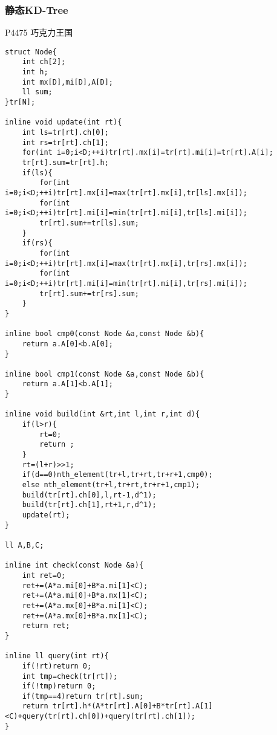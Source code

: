 \documentclass{ctexart}
\begin{document}
\subsubsection{静态KD-Tree}
P4475 巧克力王国
\begin{lstlisting}
struct Node{
	int ch[2];
	int h;
	int mx[D],mi[D],A[D];
	ll sum;
}tr[N];

inline void update(int rt){
	int ls=tr[rt].ch[0];
	int rs=tr[rt].ch[1];
	for(int i=0;i<D;++i)tr[rt].mx[i]=tr[rt].mi[i]=tr[rt].A[i];
	tr[rt].sum=tr[rt].h;
	if(ls){
		for(int i=0;i<D;++i)tr[rt].mx[i]=max(tr[rt].mx[i],tr[ls].mx[i]);
		for(int i=0;i<D;++i)tr[rt].mi[i]=min(tr[rt].mi[i],tr[ls].mi[i]);
		tr[rt].sum+=tr[ls].sum;
	}
	if(rs){
		for(int i=0;i<D;++i)tr[rt].mx[i]=max(tr[rt].mx[i],tr[rs].mx[i]);
		for(int i=0;i<D;++i)tr[rt].mi[i]=min(tr[rt].mi[i],tr[rs].mi[i]);
		tr[rt].sum+=tr[rs].sum;
	}
}

inline bool cmp0(const Node &a,const Node &b){
	return a.A[0]<b.A[0];
}

inline bool cmp1(const Node &a,const Node &b){
	return a.A[1]<b.A[1];
}

inline void build(int &rt,int l,int r,int d){
	if(l>r){
		rt=0;
		return ;
	}
	rt=(l+r)>>1;
	if(d==0)nth_element(tr+l,tr+rt,tr+r+1,cmp0);
	else nth_element(tr+l,tr+rt,tr+r+1,cmp1);
	build(tr[rt].ch[0],l,rt-1,d^1);
	build(tr[rt].ch[1],rt+1,r,d^1);
	update(rt);
}

ll A,B,C;

inline int check(const Node &a){
	int ret=0;
	ret+=(A*a.mi[0]+B*a.mi[1]<C);
	ret+=(A*a.mi[0]+B*a.mx[1]<C);
	ret+=(A*a.mx[0]+B*a.mi[1]<C);
	ret+=(A*a.mx[0]+B*a.mx[1]<C);
	return ret;
}

inline ll query(int rt){
	if(!rt)return 0;
	int tmp=check(tr[rt]);
	if(!tmp)return 0;
	if(tmp==4)return tr[rt].sum;
	return tr[rt].h*(A*tr[rt].A[0]+B*tr[rt].A[1]<C)+query(tr[rt].ch[0])+query(tr[rt].ch[1]);
}
\end{lstlisting}
\end{document}
